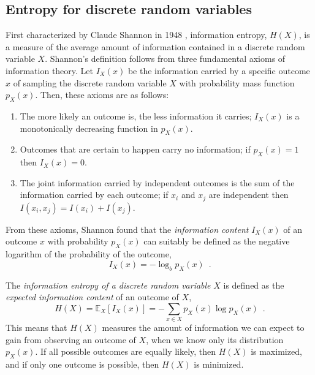 \subsection{Entropy for discrete random variables}

First characterized by Claude Shannon in 1948 \cite{shannon_mathematical_1948}, information entropy, $H(X)$, is a measure of the average amount of information contained in a discrete random variable $X$. Shannon's definition follows from three fundamental axioms of information theory. Let $I_X(x)$ be the information carried by a specific outcome $x$ of sampling the discrete random variable $X$ with probability mass function $p_X(x)$. Then, these axioms are as follows:
\begin{enumerate}[label=(\Roman*)]
    \item The more likely an outcome is, the less information it carries; $I_X(x)$ is a monotonically decreasing function in $p_X(x)$.
    \item Outcomes that are certain to happen carry no information; if $p_X(x) = 1$ then $I_X(x) = 0$.
    \item The joint information carried by independent outcomes is the sum of the information carried by each outcome; if $x_i$ and $x_j$ are independent then $I(x_i, x_j) = I(x_i) + I(x_j)$. 
\end{enumerate}

From these axioms, Shannon found that the \emph{information content} $I_X(x)$ of an outcome $x$ with probability $p_X(x)$ can suitably be defined as the negative logarithm of the probability of the outcome,
%
\begin{equation} \label{eq:information-content}
    I_X(x) = -\log_b p_X(x) \enspace .
\end{equation}
%

The \emph{information entropy of a discrete random variable} $X$ is defined as the \emph{expected information content} of an outcome of $X$,
%
\begin{equation} \label{eq:information-entropy}
    H(X) = \mathbb{E}_X\left[I_X(x)\right] = - \sum_{x\in X} p_X(x) \log p_X(x) \enspace .
\end{equation}
%
This means that $H(X)$ measures the amount of information we can expect to gain from observing an outcome of $X$, when we know only its distribution $p_X(x)$. If all possible outcomes are equally likely, then $H(X)$ is maximized, and if only one outcome is possible, then $H(X)$ is minimized.



